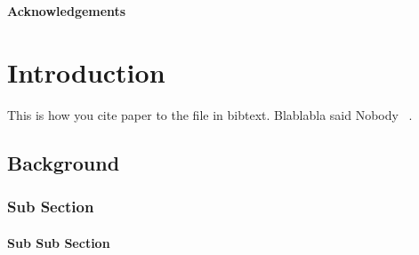 \documentclass{thesis}
\author{John Doe}                                   %
\date{May 2018}                                     %
\begin{document}
\maketitle
\newpage

\doublespacing


\begin{abstract}
\blindtext
\end{abstract}

\begin{center}
	\textbf{Acknowledgements}
\end{center}

\blindtext

\clearpage


\tableofcontents

\listoffigures

\listoftables



\clearpage



\setcounter{page}{1}

\chapter{Introduction}

\blindtext
This is how you cite paper to the file in bibtext. Blablabla said Nobody ~\cite{Nobody06}.

\section{Background}

\subsection{Sub Section}

\subsubsection{Sub Sub Section}


\blindtext


\singlespacing

{}

\end{document}
